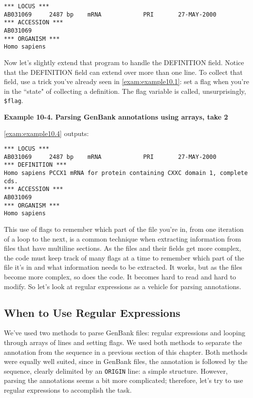 \begin{lstlisting}
*** LOCUS ***
AB031069     2487 bp    mRNA            PRI       27-MAY-2000
*** ACCESSION ***
AB031069
*** ORGANISM ***
Homo sapiens
\end{lstlisting}

Now let's slightly extend that program to handle the DEFINITION field. Notice that the DEFINITION field can extend over more than one line. To collect that field, use a trick you've already seen in \autoref{exam:example10.1}: set a flag when you're in the ``state" of collecting a definition. The flag variable is called, unsurprisingly, \verb|$flag|.

\textbf{Example 10-4. Parsing GenBank annotations using arrays, take 2}


\autoref{exam:example10.4} outputs:

\begin{lstlisting}
*** LOCUS ***
AB031069     2487 bp    mRNA            PRI       27-MAY-2000
*** DEFINITION ***
Homo sapiens PCCX1 mRNA for protein containing CXXC domain 1, complete
cds.
*** ACCESSION ***
AB031069
*** ORGANISM ***
Homo sapiens
\end{lstlisting}

This use of flags to remember which part of the file you're in, from one iteration of a loop to the next, is a common technique when extracting information from files that have multiline sections. As the files and their fields get more complex, the code must keep track of many flags at a time to remember which part of the file it's in and what information needs to be extracted. It works, but as the files become more complex, so does the code. It becomes hard to read and hard to modify. So let's look at regular expressions as a vehicle for parsing annotations.

\subsection{When to Use Regular Expressions}
We've used two methods to parse GenBank files: regular expressions and looping through arrays of lines and setting flags. We used both methods to separate the annotation from the sequence in a previous section of this chapter. Both methods were equally well suited, since in GenBank files, the annotation is followed by the sequence, clearly delimited by an \verb|ORIGIN| line: a simple structure. However, parsing the annotations seems a bit more complicated; therefore, let's try to use regular expressions to accomplish the task.

